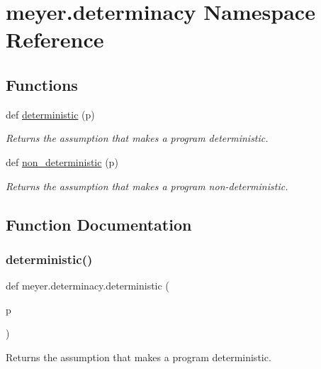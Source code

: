 \hypertarget{namespacemeyer_1_1determinacy}{}\section{meyer.\+determinacy Namespace Reference}
\label{namespacemeyer_1_1determinacy}
\subsection*{Functions}
\begin{DoxyCompactItemize}
\item 
def \hyperlink{namespacemeyer_1_1determinacy_a32a3014f415562fb3b06abc70f14add9}{deterministic} (p)
\begin{DoxyCompactList}\small\item\em Returns the assumption that makes a program deterministic. \end{DoxyCompactList}\item 
def \hyperlink{namespacemeyer_1_1determinacy_a4013ef0cd782a1778b3f728536039f64}{non\+\_\+deterministic} (p)
\begin{DoxyCompactList}\small\item\em Returns the assumption that makes a program non-\/deterministic. \end{DoxyCompactList}\end{DoxyCompactItemize}


\subsection{Function Documentation}
\mbox{\label{namespacemeyer_1_1determinacy_a32a3014f415562fb3b06abc70f14add9}} 
\subsubsection{\texorpdfstring{deterministic()}{deterministic()}}
{\footnotesize\ttfamily def meyer.\+determinacy.\+deterministic (\begin{DoxyParamCaption}\item[{}]{p }\end{DoxyParamCaption})}



Returns the assumption that makes a program deterministic. 


